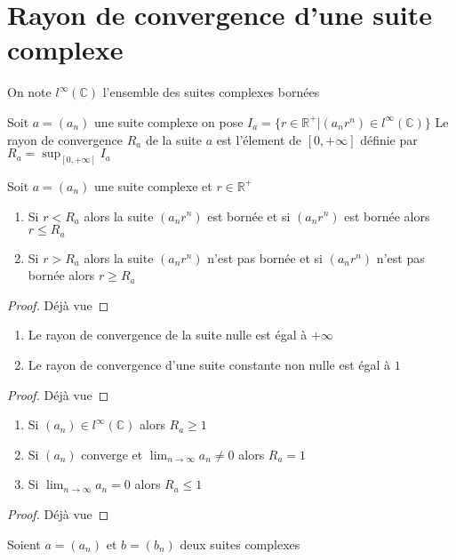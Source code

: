 \documentclass[11pt,hidelinks]{book}
\theoremstyle{mytheoremstyle}
\theoremstyle{mytheoremstyle}
\theoremstyle{mytheoremstyle}
\theoremstyle{mytheoremstyle}
\theoremstyle{mytheoremstyle}
\theoremstyle{mytheoremstyle}
\theoremstyle{mytheoremstyle}
\theoremstyle{mytheoremstyle}
\theoremstyle{myproblemstyle}
\def\mbb#1{\mathbb{#1}}
\def\bC{\mbb{C}}
\def\bR{\mbb{R}}
\def\born{l^{\infty}\left( \bC \right)}
\def\ln{\lim_{n \to \infty}}
\begin{document}
\chapter{Rayon de convergence d'une suite complexe}
\begin{definition}
    On note $l^{\infty} \left( \bC \right)$ l'ensemble des suites complexes bornées
\end{definition}
\begin{definition}
    Soit $a = (a_n)$ une suite complexe on pose $I_a = \{ r \in \bR^{+} | (a_nr^n) \in \born \}$
    Le rayon de convergence $R_a$ de la suite $a$ est l'élement de $[0, +\infty]$ définie par $R_a = \sup_{[0,+\infty]} I_a$
\end{definition}
\begin{adjustwidth}{-2em}{-1em}
    \begin{prop}
        Soit $a = (a_n)$ une suite complexe et $r \in \bR^{+}$
        \begin{enumerate}
         \item Si $r < R_a$ alors la suite $(a_nr^n)$ est bornée et si $(a_nr^n)$ est bornée alors $r \leq R_a$ 
         \item Si $r > R_a$ alors la suite $(a_nr^n)$ n'est pas bornée et si $(a_nr^n)$ n'est pas bornée alors $r \geq R_a$
        \end{enumerate}
        \begin{proof}
            Déjà vue
        \end{proof}
    \end{prop}
    \begin{prop}
        \begin{enumerate}
        \item Le rayon de convergence de la suite nulle est égal à $+\infty$ 
        \item Le rayon de convergence d'une suite constante non nulle est égal à $1$
        \end{enumerate}
        \begin{proof}
            Déjà vue
        \end{proof}
    \end{prop}
    \begin{prop}
        \begin{enumerate}
        \item Si $(a_n) \in \born$ alors $R_a \geq 1$
        \item Si $(a_n)$ converge et $\ln a_n \not = 0$ alors $R_a = 1$ 
        \item Si $\ln a_n = 0$ alors $R_a \leq 1$
        \end{enumerate}
        \begin{proof}
            Déjà vue
        \end{proof}
    \end{prop}
    \begin{prop}
        Soient $a = (a_n)$ et $b = (b_n)$ deux suites complexes


\end{prop}
\end{adjustwidth}
\end{document}
